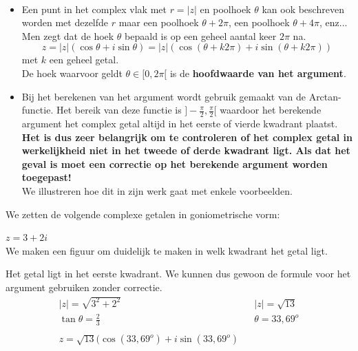 \begin{opmerking}
\ \\
\begin{itemize}
	\item Een punt in het complex vlak met $r=|z|$ en poolhoek $\theta$ kan ook beschreven worden met dezelfde $r$ maar een poolhoek $\theta+2\pi$, een poolhoek $\theta+ 4\pi$, enz... Men zegt dat de hoek $\theta$ bepaald is op een geheel aantal keer $2\pi$ na.
	\[ z=|z|(\cos \theta + i \sin \theta)=|z|(\cos(\theta +k2\pi)+i \sin(\theta+k2\pi)) \]
	met $k$ een geheel getal.\\
	De hoek waarvoor geldt $\theta \in [0,2\pi[$ is de {\bf hoofdwaarde van het argument}. 
	\item Bij het berekenen van het argument wordt gebruik gemaakt van de Arctan-functie. Het bereik van deze functie is $]-\frac{\pi}{2},\frac{\pi}{2}[$ waardoor het berekende argument het complex getal altijd in het eerste of vierde kwadrant plaatst.\\ 
	{\bf Het is dus zeer belangrijk om te controleren of het complex getal in werkelijkheid niet in het tweede of derde kwadrant ligt. Als dat het geval is moet een correctie op het berekende argument worden toegepast!} \\ We illustreren hoe dit in zijn werk gaat met enkele voorbeelden.
\end{itemize}

\end{opmerking}

	We zetten de volgende complexe getalen in goniometrische vorm: \\
\begin{voorbeeld}


	$z=3+2i$ \\  We maken een figuur om duidelijk te maken in welk kwadrant het getal ligt. \\
	
	

	Het getal ligt in het eerste kwadrant. We kunnen dus gewoon de formule voor het argument gebruiken zonder correctie.\\
	\[ \begin{array}{lll}
	|z|=\sqrt{3^2 +2^2} & & |z|=\sqrt{13} \\
	\tan \theta = \frac{2}{3} & & \theta = 33,69^{o}\\
	         & &      \\
	z=\sqrt{13} (\cos (33,69^{o}) + i \sin (33,69^{o})  &  &
	\end{array} \]
\end{voorbeeld}
	
